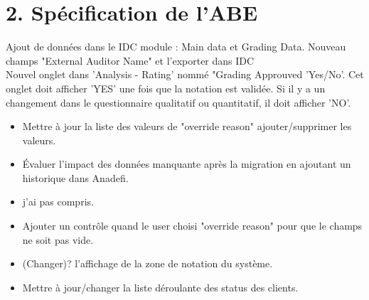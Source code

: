 \section*{2. Spécification de l'ABE}


Ajout de données dans le IDC module : Main data et Grading Data. Nouveau champs "External Auditor Name" et l'exporter dans IDC\\

Nouvel onglet dans 'Analysis - Rating' nommé "Grading Approuved 'Yes/No'. Cet onglet doit afficher 'YES' une fois que la notation est validée. Si il y a un changement dans le questionnaire qualitatif ou quantitatif, il doit afficher 'NO'.\\

\begin{itemize}
\item Mettre à jour la liste des valeurs de "override reason" ajouter/supprimer les valeurs.
\item Évaluer l'impact des données manquante après la migration en ajoutant un historique dans Anadefi.
\item j'ai pas compris.
\item Ajouter un contrôle quand le user choisi "override reason" pour que le champs ne soit pas vide.
\item (Changer)? l'affichage de la zone de notation du système.
\item Mettre à jour/changer la liste déroulante des status des clients.
\end{itemize}
